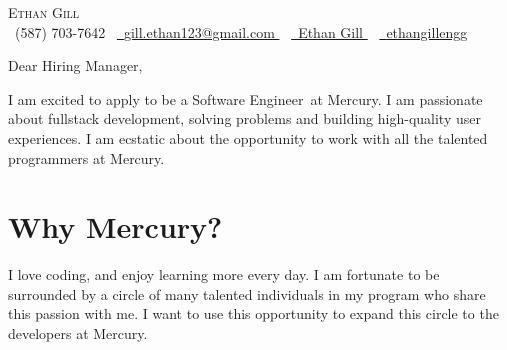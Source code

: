 
\newcommand{\userName}{Ethan Gill}
\newcommand{\userFullName}{Ethan Gill}
\newcommand{\userPhone}{(587) 703-7642}
\newcommand{\userEmail}{gill.ethan123@gmail.com}
\newcommand{\userGithub}{ethangillengg}
\newcommand{\userLinkedIn}{https://www.linkedin.com/in/ethan-gill-008a00258/}
\newcommand{\currentUniversity}{the University of Calgary's Schulich School of Engineering}
\newcommand{\companyName}{Mercury}
\newcommand{\jobTitle}{Software Engineer}
\newcommand{\introTopics}{fullstack development, solving problems and building high-quality user experiences}
\newcommand{\whyMePersonalized}{Since my graduation, I have been able to utilize all of the concepts I learned through my education while also expanding my knowledge base.

	\par
	I work with ASP.NET and SQL Server on a daily basis, while also working with jQuery. This matches perfectly with the architecture at \companyName~and will allow me to transition smoothly into the role.
}



\begin{center}
	{\Huge \scshape \userFullName} \\ \vspace{4pt}
	\small \raisebox{-0.1\height}\faPhone\ \userPhone ~
	\href{mailto:\userEmail}{
		\raisebox{-0.2\height}\faEnvelope\  \underline{\userEmail}
	} ~
	\href{\userLinkedIn}{
		\raisebox{-0.2\height}\faLinkedin\ \underline{\userName}
	} ~
	\href{https://github.com/\userGithub}{
		\raisebox{-0.2\height}\faGithub\ \underline{\userGithub}
	} 
\end{center}

\vspace{8pt}

\noindent{}\large{Dear Hiring Manager,}

\par{}

I am excited to apply to be a \jobTitle~at \companyName. I am passionate about \introTopics. I am ecstatic about the opportunity to work with all the talented programmers at \companyName.

\section{Why \companyName?}
I love coding, and enjoy learning more every day. I am fortunate to be surrounded by a circle of many talented individuals in my program who share this passion with me. I want to use this opportunity to expand this circle to the developers at \companyName.

